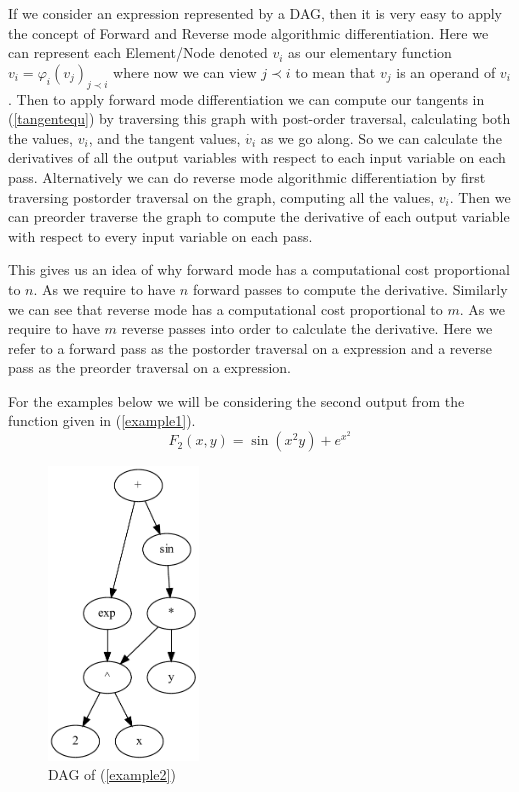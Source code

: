 \documentclass{article}
\begin{document}
If we consider an expression represented by a DAG, then it is very easy to apply the concept of Forward and Reverse mode algorithmic differentiation. Here we can represent each Element/Node denoted $v_i$ as our elementary function $v_i = \varphi_i (v_j)_{j \prec i}$ where now we can view $j \prec i$ to mean that $v_j$ is an operand of $v_i$. Then to apply forward mode differentiation we can compute our tangents in (\ref{tangentequ}) by traversing this graph with post-order traversal, calculating both the values, $v_i$, and the tangent values, $\Dot{v_i}$ as we go along. So we can calculate the derivatives of all the output variables with respect to each input variable on each pass. Alternatively we can do reverse mode algorithmic differentiation by first traversing postorder traversal on the graph, computing all the values, $v_i$. Then we can preorder traverse the graph to compute the derivative of each output variable with respect to every input variable on each pass.

This gives us an idea of why forward mode has a computational cost proportional to $n$. As we require to have $n$ forward passes to compute the derivative. Similarly we can see that reverse mode has a computational cost proportional to $m$. As we require to have $m$ reverse passes into order to calculate the derivative. Here we refer to a forward pass as the postorder traversal on a expression and a reverse pass as the preorder traversal on a expression.

For the examples below we will be considering the second output from the function given in (\ref{example1}).
\begin{equation}
    \label{example2}
    F_2(x,y) = \sin(x^2y) + e^{x^2}
\end{equation}


\begin{figure}[h!]
    \includegraphics[width=4cm]{images/Graph_Example2.pdf}
    \caption{DAG of (\ref{example2})}
    \label{fig:DAGgraph}
\end{figure}
\end{document}
